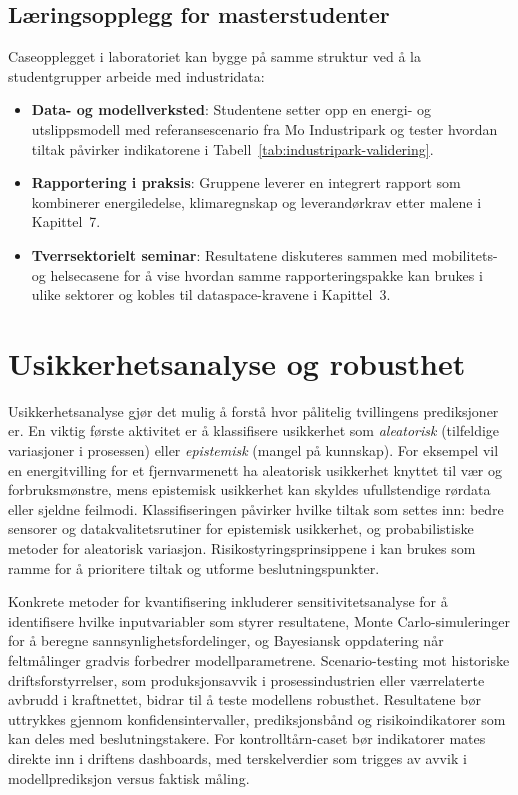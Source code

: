 \subsection{Læringsopplegg for masterstudenter}
Caseopplegget i laboratoriet kan bygge på samme struktur ved å la studentgrupper arbeide med industridata:
\begin{itemize}
    \item \textbf{Data- og modellverksted}: Studentene setter opp en energi- og utslippsmodell med referansescenario fra Mo Industripark og tester hvordan tiltak påvirker indikatorene i Tabell~\ref{tab:industripark-validering}.\citep{moindustripark2024klimaplan}
    \item \textbf{Rapportering i praksis}: Gruppene leverer en integrert rapport som kombinerer energiledelse, klimaregnskap og leverandørkrav etter malene i Kapittel~7.\citep{enova2024energiledelse,eyde2023batteri}
    \item \textbf{Tverrsektorielt seminar}: Resultatene diskuteres sammen med mobilitets- og helsecasene for å vise hvordan samme rapporteringspakke kan brukes i ulike sektorer og kobles til dataspace-kravene i Kapittel~3.\citep{heroya2024hydrogenhub,regjeringen2023grontindustriloft}
\end{itemize}

\section{Usikkerhetsanalyse og robusthet}
Usikkerhetsanalyse gjør det mulig å forstå hvor pålitelig tvillingens prediksjoner er. En viktig første aktivitet er å klassifisere usikkerhet som \textit{aleatorisk} (tilfeldige variasjoner i prosessen) eller \textit{epistemisk} (mangel på kunnskap). For eksempel vil en energitvilling for et fjernvarmenett ha aleatorisk usikkerhet knyttet til vær og forbruksmønstre, mens epistemisk usikkerhet kan skyldes ufullstendige rørdata eller sjeldne feilmodi. Klassifiseringen påvirker hvilke tiltak som settes inn: bedre sensorer og datakvalitetsrutiner for epistemisk usikkerhet, og probabilistiske metoder for aleatorisk variasjon. Risikostyringsprinsippene i \citet{iso31000-2018} kan brukes som ramme for å prioritere tiltak og utforme beslutningspunkter.

Konkrete metoder for kvantifisering inkluderer sensitivitetsanalyse for å identifisere hvilke inputvariabler som styrer resultatene, Monte Carlo-simuleringer for å beregne sannsynlighetsfordelinger, og Bayesiansk oppdatering når feltmålinger gradvis forbedrer modellparametrene. Scenario-testing mot historiske driftsforstyrrelser, som produksjonsavvik i prosessindustrien eller værrelaterte avbrudd i kraftnettet, bidrar til å teste modellens robusthet. Resultatene bør uttrykkes gjennom konfidensintervaller, prediksjonsbånd og risikoindikatorer som kan deles med beslutningstakere. For kontrolltårn-caset bør indikatorer mates direkte inn i driftens dashboards, med terskelverdier som trigges av avvik i modellprediksjon versus faktisk måling.

